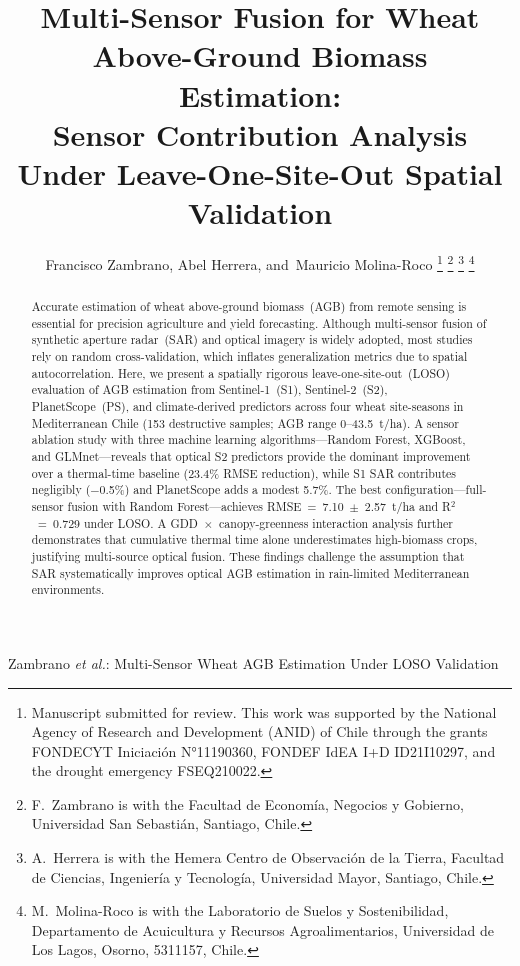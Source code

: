 \documentclass[lettersize,journal]{IEEEtran}
\begin{document}
\title{Multi-Sensor Fusion for Wheat Above-Ground Biomass Estimation:\\
Sensor Contribution Analysis Under Leave-One-Site-Out Spatial Validation}

\author{Francisco Zambrano,
        Abel Herrera,
        and~Mauricio Molina-Roco%
\thanks{Manuscript submitted for review. This work was supported by the National Agency of Research and Development (ANID) of Chile through the grants FONDECYT Iniciación N°11190360, FONDEF IdEA I+D ID21I10297, and the drought emergency FSEQ210022.}%
\thanks{F.~Zambrano is with the Facultad de Economía, Negocios y Gobierno, Universidad San Sebastián, Santiago, Chile.}%
\thanks{A.~Herrera is with the Hemera Centro de Observación de la Tierra, Facultad de Ciencias, Ingeniería y Tecnología, Universidad Mayor, Santiago, Chile.}%
\thanks{M.~Molina-Roco is with the Laboratorio de Suelos y Sostenibilidad, Departamento de Acuicultura y Recursos Agroalimentarios, Universidad de Los Lagos, Osorno, 5311157, Chile.}}

%
{Zambrano \MakeLowercase{\textit{et al.}}: Multi-Sensor Wheat AGB Estimation Under LOSO Validation}


\maketitle

\begin{abstract}
Accurate estimation of wheat above-ground biomass~(AGB) from remote sensing
is essential for precision agriculture and yield forecasting. Although
multi-sensor fusion of synthetic aperture radar~(SAR) and optical imagery is
widely adopted, most studies rely on random cross-validation, which inflates
generalization metrics due to spatial autocorrelation. Here, we present a
spatially rigorous leave-one-site-out~(LOSO) evaluation of AGB estimation
from Sentinel-1~(S1), Sentinel-2~(S2), PlanetScope~(PS), and climate-derived
predictors across four wheat site-seasons in Mediterranean Chile (153
destructive samples; AGB range 0--43.5~t/ha). A sensor ablation study with
three machine learning algorithms---Random Forest, XGBoost, and
GLMnet---reveals that optical S2 predictors provide the dominant improvement
over a thermal-time baseline (23.4\% RMSE reduction), while S1 SAR
contributes negligibly ($-$0.5\%) and PlanetScope adds a modest 5.7\%.
The best configuration---full-sensor fusion with Random Forest---achieves
RMSE~=~7.10~$\pm$~2.57~t/ha and R$^2$~=~0.729 under LOSO. A
GDD~$\times$~canopy-greenness interaction analysis further demonstrates that
cumulative thermal time alone underestimates high-biomass crops, justifying
multi-source optical fusion. These findings challenge the assumption that SAR
systematically improves optical AGB estimation in rain-limited Mediterranean
environments.
\end{abstract}
\end{document}
